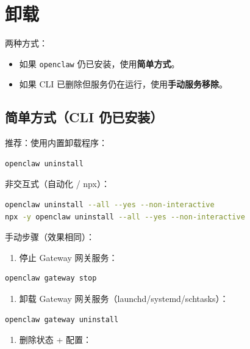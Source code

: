\clearpage

\section{卸载}


两种方式：

\begin{itemize}
  \item 如果 \texttt{openclaw} 仍已安装，使用\textbf{简单方式}。
  \item 如果 CLI 已删除但服务仍在运行，使用\textbf{手动服务移除}。
\end{itemize}


\subsection{简单方式（CLI 仍已安装）}


推荐：使用内置卸载程序：

\begin{lstlisting}[language=bash]
openclaw uninstall
\end{lstlisting}


非交互式（自动化 / npx）：

\begin{lstlisting}[language=bash]
openclaw uninstall --all --yes --non-interactive
npx -y openclaw uninstall --all --yes --non-interactive
\end{lstlisting}


手动步骤（效果相同）：

\begin{enumerate}
  \item 停止 Gateway 网关服务：
\end{enumerate}


\begin{lstlisting}[language=bash]
openclaw gateway stop
\end{lstlisting}


\begin{enumerate}
  \item 卸载 Gateway 网关服务（launchd/systemd/schtasks）：
\end{enumerate}


\begin{lstlisting}[language=bash]
openclaw gateway uninstall
\end{lstlisting}


\begin{enumerate}
  \item 删除状态 + 配置：
\end{enumerate}


